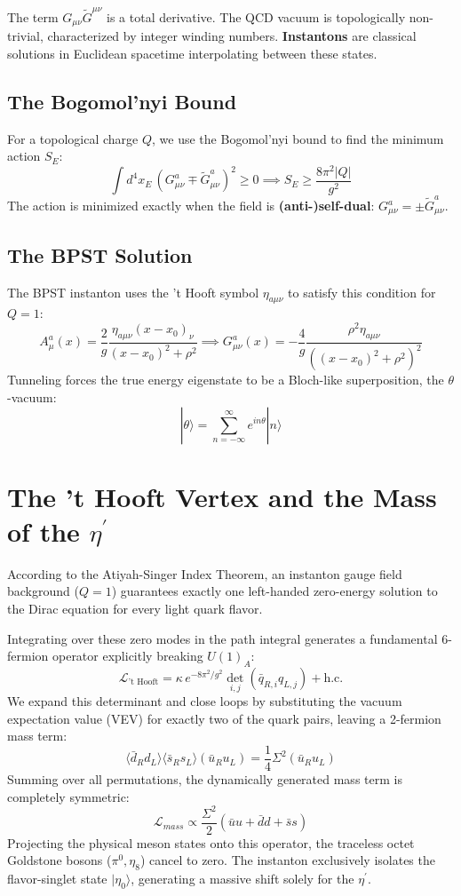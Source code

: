\documentclass[12pt, a4paper]{article}
\begin{document}
The term $G_{\mu\nu}\tilde{G}^{\mu\nu}$ is a total derivative. The QCD vacuum is topologically non-trivial, characterized by integer winding numbers. \textbf{Instantons} are classical solutions in Euclidean spacetime interpolating between these states.

\subsection{The Bogomol'nyi Bound}
For a topological charge $Q$, we use the Bogomol'nyi bound to find the minimum action $S_E$:
\[
\int d^4x_E \, (G_{\mu\nu}^a \mp \tilde{G}_{\mu\nu}^a)^2 \ge 0 \implies S_E \ge \frac{8\pi^2 |Q|}{g^2}
\]
The action is minimized exactly when the field is \textbf{(anti-)self-dual}: $G_{\mu\nu}^a = \pm \tilde{G}_{\mu\nu}^a$.

\subsection{The BPST Solution}
The BPST instanton uses the 't Hooft symbol $\eta_{a\mu\nu}$ to satisfy this condition for $Q=1$:
\[
A_\mu^a(x) = \frac{2}{g} \frac{\eta_{a\mu\nu} (x - x_0)_\nu}{(x - x_0)^2 + \rho^2} \implies G_{\mu\nu}^a(x) = -\frac{4}{g} \frac{\rho^2 \eta_{a\mu\nu}}{((x - x_0)^2 + \rho^2)^2}
\]
Tunneling forces the true energy eigenstate to be a Bloch-like superposition, the $\theta$-vacuum:
\[
|\theta\rangle = \sum_{n=-\infty}^{\infty} e^{in\theta} |n\rangle
\]

\section{The 't Hooft Vertex and the Mass of the $\eta^\prime$}

According to the Atiyah-Singer Index Theorem, an instanton gauge field background ($Q=1$) guarantees exactly one left-handed zero-energy solution to the Dirac equation for every light quark flavor. 

Integrating over these zero modes in the path integral generates a fundamental 6-fermion operator explicitly breaking $U(1)_A$:
\[
\mathcal{L}_{\text{'t Hooft}} = \kappa \, e^{-8\pi^2/g^2} \det_{i,j} (\bar{q}_{R,i} q_{L,j}) + \text{h.c.}
\]
We expand this determinant and close loops by substituting the vacuum expectation value (VEV) for exactly two of the quark pairs, leaving a 2-fermion mass term:
\[
\langle \bar{d}_R d_L \rangle \langle \bar{s}_R s_L \rangle (\bar{u}_R u_L) = \frac{1}{4}\Sigma^2 (\bar{u}_R u_L)
\]
Summing over all permutations, the dynamically generated mass term is completely symmetric:
\[
\mathcal{L}_{mass} \propto \frac{\Sigma^2}{2} (\bar{u}u + \bar{d}d + \bar{s}s)
\]
Projecting the physical meson states onto this operator, the traceless octet Goldstone bosons ($\pi^0, \eta_8$) cancel to zero. The instanton exclusively isolates the flavor-singlet state $|\eta_0 \rangle$, generating a massive shift solely for the $\eta^\prime$.
\end{document}

